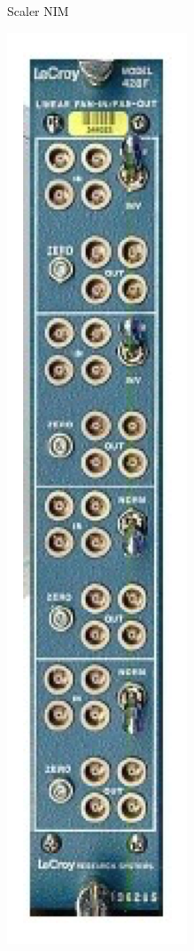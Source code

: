\begin{figure}[p]
\begin{subfigure}[t]{0.2\textwidth}
        \caption{Scaler NIM}
        \label{fig:scaler1}
    \end{subfigure}
    \hfill
    \begin{subfigure}[t]{0.2\textwidth}
        \includegraphics[height=0.25\textheight, width=\textwidth, keepaspectratio]{figures/FanInFanOut.png}

\end{subfigure}
\end{figure}
